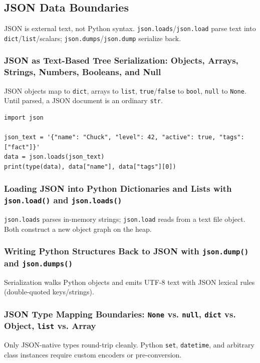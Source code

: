 \subsection{JSON Data Boundaries}

JSON is external text, not Python syntax. \texttt{json.loads}/\texttt{json.load} parse text into \texttt{dict}/\texttt{list}/scalars; \texttt{json.dumps}/\texttt{json.dump} serialize back.

\subsubsection{JSON as Text-Based Tree Serialization: Objects, Arrays, Strings, Numbers, Booleans, and Null}

JSON objects map to \texttt{dict}, arrays to \texttt{list}, \texttt{true}/\texttt{false} to \texttt{bool}, \texttt{null} to \texttt{None}. Until parsed, a JSON document is an ordinary \texttt{str}.

\begin{verbatim}
import json

json_text = '{"name": "Chuck", "level": 42, "active": true, "tags": ["fact"]}'
data = json.loads(json_text)
print(type(data), data["name"], data["tags"][0])
\end{verbatim}

\subsubsection{Loading JSON into Python Dictionaries and Lists with \texttt{json.load()} and \texttt{json.loads()}}

\texttt{json.loads} parses in-memory strings; \texttt{json.load} reads from a text file object. Both construct a new object graph on the heap.

\subsubsection{Writing Python Structures Back to JSON with \texttt{json.dump()} and \texttt{json.dumps()}}

Serialization walks Python objects and emits UTF-8 text with JSON lexical rules (double-quoted keys/strings).

\subsubsection{JSON Type Mapping Boundaries: \texttt{None} vs. \texttt{null}, \texttt{dict} vs. Object, \texttt{list} vs. Array}

Only JSON-native types round-trip cleanly. Python \texttt{set}, \texttt{datetime}, and arbitrary class instances require custom encoders or pre-conversion.
